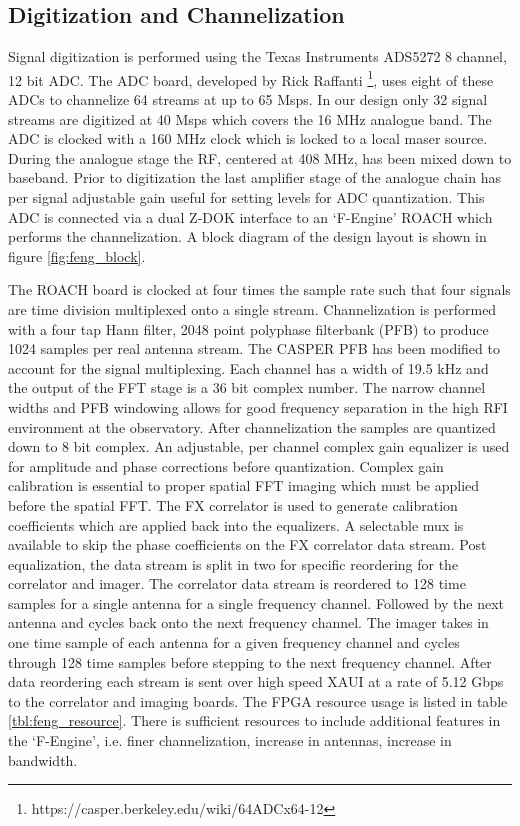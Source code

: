 \documentclass[useAMS,macros,usenatbib,onecolumn]{mn2e}
\begin{document}
\subsection{Digitization and Channelization}
\label{channelization}

Signal digitization is performed using the Texas Instruments ADS5272 8 channel, 12 bit ADC.
The ADC board, developed by Rick Raffanti \footnote{https://casper.berkeley.edu/wiki/64ADCx64-12}, uses eight of these ADCs to channelize 64 streams at up to 65 Msps.
In our design only 32 signal streams are digitized at 40 Msps which covers the 16 MHz analogue band.
The ADC is clocked with a 160 MHz clock which is locked to a local maser source.
During the analogue stage the RF, centered at 408 MHz, has been mixed down to baseband.
Prior to digitization the last amplifier stage of the analogue chain has per signal adjustable gain useful for setting levels for ADC quantization.
This ADC is connected via a dual Z-DOK interface to an `F-Engine' ROACH which performs the channelization.
A block diagram of the design layout is shown in figure \ref{fig:feng_block}.

The ROACH board is clocked at four times the sample rate such that four signals are time division multiplexed onto a single stream.
Channelization is performed with a four tap Hann filter, 2048 point polyphase filterbank (PFB) to produce 1024 samples per real antenna stream.
The CASPER PFB has been modified to account for the signal multiplexing.
Each channel has a width of 19.5 kHz and the output of the FFT stage is a 36 bit complex number.
The narrow channel widths and PFB windowing allows for good frequency separation in the high RFI environment at the observatory.
After channelization the samples are quantized down to 8 bit complex.
An adjustable, per channel complex gain equalizer is used for amplitude and phase corrections before quantization.
Complex gain calibration is essential to proper spatial FFT imaging which must be applied before the spatial FFT.
The FX correlator is used to generate calibration coefficients which are applied back into the equalizers.
A selectable mux is available to skip the phase coefficients on the FX correlator data stream.
Post equalization, the data stream is split in two for specific reordering for the correlator and imager.
The correlator data stream is reordered to 128 time samples for a single antenna for a single frequency channel.
Followed by the next antenna and cycles back onto the next frequency channel.
The imager takes in one time sample of each antenna for a given frequency channel and cycles through 128 time samples before stepping to the next frequency channel.
After data reordering each stream is sent over high speed XAUI at a rate of 5.12 Gbps to the correlator and imaging boards.
The FPGA resource usage is listed in table \ref{tbl:feng_resource}.
There is sufficient resources to include additional features in the `F-Engine', i.e. finer channelization, increase in antennas, increase in bandwidth.
\end{document}
